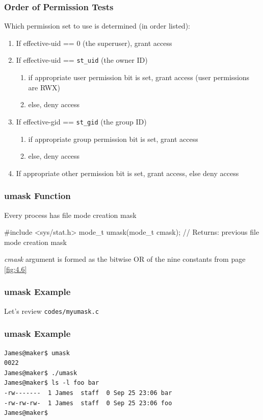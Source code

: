 \documentclass[newPxFont,sthlmFooter,nooffset]{beamer}
\begin{document}
\begin{frame}
  \frametitle{Order of Permission Tests}
Which permission set to use is determined (in order listed):
\begin{enumerate}
\item If effective-uid == 0 (the superuser), grant access
\item If effective-uid == \texttt{st\_uid} (the owner ID)
   \begin{enumerate}
   \item if appropriate user permission bit is set, grant access (user
     permissions are RWX)
   \item else, deny access
   \end{enumerate}
\item If effective-gid == \texttt{st\_gid} (the group ID)
   \begin{enumerate}
   \item if appropriate group permission bit is set, grant access
   \item else, deny access
   \end{enumerate}
\item If appropriate other permission bit is set, grant access, else deny access
\end{enumerate}
\end{frame}



\begin{frame}[containsverbatim,t]
  \frametitle{umask Function}
Every process has file mode creation mask

\begin{codedef}
#include <sys/stat.h>
mode_t umask(mode_t cmask);
// Returns: previous file mode creation mask
\end{codedef}

\textit{cmask} argument is formed as the bitwise OR of the nine constants from page \ref{fig:4.6}
\end{frame}


\begin{frame}[containsverbatim,t]
  \frametitle{umask Example}
Let's review \texttt{codes/myumask.c}

\end{frame}


\begin{frame}[containsverbatim,t]
  \frametitle{umask Example}
{\footnotesize
\begin{verbatim}
James@maker$ umask
0022
James@maker$ ./umask
James@maker$ ls -l foo bar
-rw-------  1 James  staff  0 Sep 25 23:06 bar
-rw-rw-rw-  1 James  staff  0 Sep 25 23:06 foo
James@maker$
\end{verbatim}
}
\end{frame}
\end{document}
